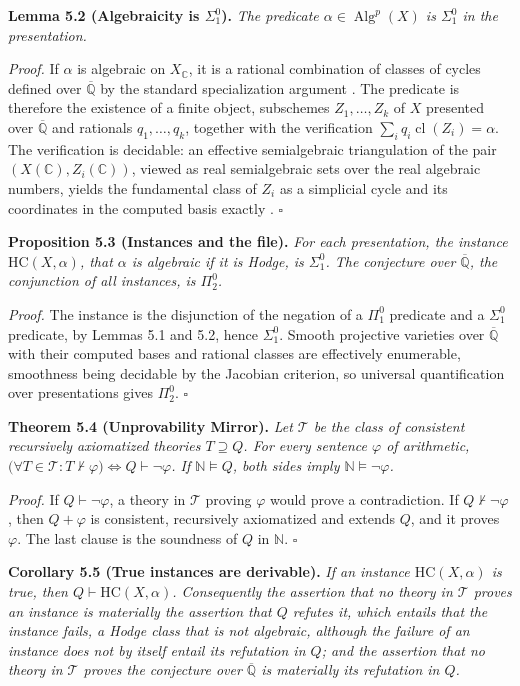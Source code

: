 \documentclass[10pt,twocolumn]{article}
\begin{document}
\textbf{Lemma 5.2 (Algebraicity is \(\Sigma^0_1\)).} \emph{The predicate
\(\alpha\in\operatorname{Alg}^p(X)\) is \(\Sigma^0_1\) in the
presentation.}

\emph{Proof.} If \(\alpha\) is algebraic on \(X_{\mathbb{C}}\), it is a
rational combination of classes of cycles defined over
\(\overline{\mathbb{Q}}\) by the standard specialization argument
\cite{voisin2007}. The predicate is therefore the existence of a finite
object, subschemes \(Z_1,\dots,Z_k\) of \(X\) presented over
\(\overline{\mathbb{Q}}\) and rationals \(q_1,\dots,q_k\), together with
the verification \(\sum_i q_i\operatorname{cl}(Z_i)=\alpha\). The
verification is decidable: an effective semialgebraic triangulation of
the pair \((X(\mathbb{C}),Z_i(\mathbb{C}))\), viewed as real
semialgebraic sets over the real algebraic numbers, yields the
fundamental class of \(Z_i\) as a simplicial cycle and its coordinates
in the computed basis exactly \cite{bpr2006}. \(\square\)

\textbf{Proposition 5.3 (Instances and the file).} \emph{For each
presentation, the instance \(\mathrm{HC}(X,\alpha)\), that \(\alpha\) is
algebraic if it is Hodge, is \(\Sigma^0_1\). The conjecture over
\(\overline{\mathbb{Q}}\), the conjunction of all instances, is
\(\Pi^0_2\).}

\emph{Proof.} The instance is the disjunction of the negation of a
\(\Pi^0_1\) predicate and a \(\Sigma^0_1\) predicate, by Lemmas 5.1 and
5.2, hence \(\Sigma^0_1\). Smooth projective varieties over
\(\overline{\mathbb{Q}}\) with their computed bases and rational classes
are effectively enumerable, smoothness being decidable by the Jacobian
criterion, so universal quantification over presentations gives
\(\Pi^0_2\). \(\square\)

\textbf{Theorem 5.4 (Unprovability Mirror).} \emph{Let \(\mathcal{T}\)
be the class of consistent recursively axiomatized theories
\(T\supseteq Q\). For every sentence \(\varphi\) of arithmetic,
\(\big(\forall T\in\mathcal{T}:T\nvdash\varphi\big)\iff Q\vdash\neg\varphi\).
If \(\mathbb{N}\models Q\), both sides imply
\(\mathbb{N}\models\neg\varphi\).}

\emph{Proof.} If \(Q\vdash\neg\varphi\), a theory in \(\mathcal{T}\)
proving \(\varphi\) would prove a contradiction. If
\(Q\nvdash\neg\varphi\), then \(Q+\varphi\) is consistent, recursively
axiomatized and extends \(Q\), and it proves \(\varphi\). The last
clause is the soundness of \(Q\) in \(\mathbb{N}\). \(\square\)

\textbf{Corollary 5.5 (True instances are derivable).} \emph{If an
instance \(\mathrm{HC}(X,\alpha)\) is true, then
\(Q\vdash\mathrm{HC}(X,\alpha)\). Consequently the assertion that no
theory in \(\mathcal{T}\) proves an instance is materially the assertion
that \(Q\) refutes it, which entails that the instance fails, a Hodge
class that is not algebraic, although the failure of an instance does
not by itself entail its refutation in \(Q\); and the assertion that no
theory in \(\mathcal{T}\) proves the conjecture over
\(\overline{\mathbb{Q}}\) is materially its refutation in \(Q\).}
\end{document}
